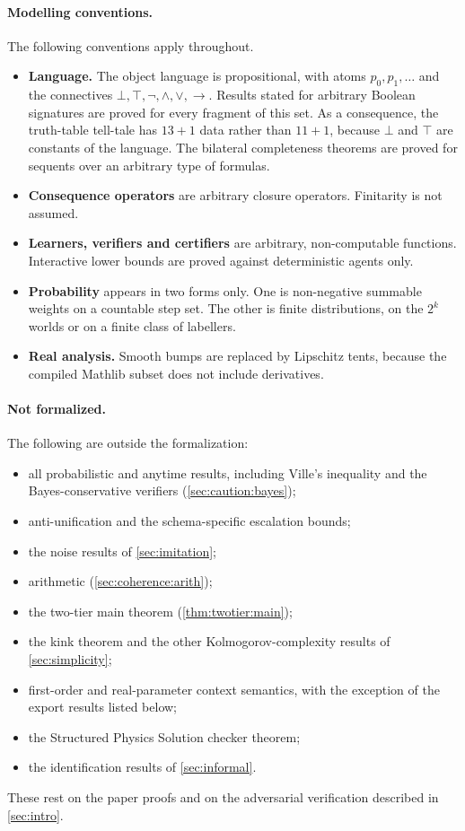 \paragraph{Modelling conventions.} The following conventions apply throughout.
\begin{itemize}
\item \textbf{Language.} The object language is propositional, with atoms $p_0,p_1,\dots$ and the connectives $\bot,\top,\neg,\wedge,\vee,\to$. Results stated for arbitrary Boolean signatures are proved for every fragment of this set. As a consequence, the truth-table tell-tale has $13+1$ data rather than $11+1$, because $\bot$ and $\top$ are constants of the language. The bilateral completeness theorems are proved for sequents over an arbitrary type of formulas.
\item \textbf{Consequence operators} are arbitrary closure operators. Finitarity is not assumed.
\item \textbf{Learners, verifiers and certifiers} are arbitrary, non-computable functions. Interactive lower bounds are proved against deterministic agents only.
\item \textbf{Probability} appears in two forms only. One is non-negative summable weights on a countable step set. The other is finite distributions, on the $2^k$ worlds or on a finite class of labellers.
\item \textbf{Real analysis.} Smooth bumps are replaced by Lipschitz tents, because the compiled Mathlib subset does not include derivatives.
\end{itemize}

\paragraph{Not formalized.} The following are outside the formalization:
\begin{itemize}
\item all probabilistic and anytime results, including Ville's inequality and the Bayes-conservative verifiers (\cref{sec:caution:bayes});
\item anti-unification and the schema-specific escalation bounds;
\item the noise results of \cref{sec:imitation};
\item arithmetic (\cref{sec:coherence:arith});
\item the two-tier main theorem (\cref{thm:twotier:main});
\item the kink theorem and the other Kolmogorov-complexity results of \cref{sec:simplicity};
\item first-order and real-parameter context semantics, with the exception of the export results listed below;
\item the Structured Physics Solution checker theorem;
\item the identification results of \cref{sec:informal}.
\end{itemize}
These rest on the paper proofs and on the adversarial verification described in \cref{sec:intro}.

